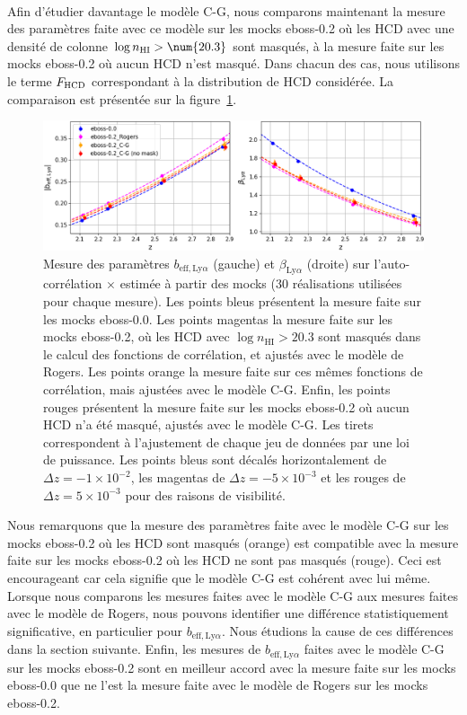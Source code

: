 \paragraph{}
Afin d'étudier davantage le modèle C-G, nous comparons maintenant la mesure des paramètres \lya{} faite avec ce modèle sur les mocks eboss-0.2 où les HCD avec une densité de colonne $\log n_{\textsc{HI}} > \num{20.3}$ sont masqués, à la mesure faite sur les mocks eboss-0.2 où aucun HCD n'est masqué. Dans chacun des cas, nous utilisons le terme $F_{\textsc{HCD}}$ correspondant à la distribution de HCD considérée.
La comparaison est présentée sur la figure~\ref{fig:bias_cg_rogers_comp}.
\begin{figure}
  \centering
  \includegraphics[scale=0.43]{bias_cg_rogers_comp}
  \caption{Mesure des paramètres $b_{\mathrm{eff},\mathrm{Ly}\alpha}$ (gauche) et $\beta_{\mathrm{Ly}\alpha}$ (droite) sur l'auto-corrélation \lya$\times$\lya{} estimée à partir des mocks (30 réalisations utilisées pour chaque mesure). Les points bleus présentent la mesure faite sur les mocks eboss-0.0. Les points magentas la mesure faite sur les mocks eboss-0.2, où les HCD avec $\log n_{\mathrm{HI}} > \num{20.3}$ sont masqués dans le calcul des fonctions de corrélation, et ajustés avec le modèle de Rogers. Les points orange la mesure faite sur ces mêmes fonctions de corrélation, mais ajustées avec le modèle C-G. Enfin, les points rouges présentent la mesure faite sur les mocks eboss-0.2 où aucun HCD n'a été masqué, ajustés avec le modèle C-G.
    Les tirets correspondent à l'ajustement de chaque jeu de données par une loi de puissance.
Les points bleus sont décalés horizontalement de $\Delta z = -1\times10^{-2}$, les magentas de $\Delta z = -5\times10^{-3}$ et les rouges de $\Delta z = 5\times10^{-3}$ pour des raisons de visibilité.}
  \label{fig:bias_cg_rogers_comp}
\end{figure}
Nous remarquons que la mesure des paramètres \lya{} faite avec le modèle C-G sur les mocks eboss-0.2 où les HCD sont masqués (orange) est compatible avec la mesure faite sur les mocks eboss-0.2 où les HCD ne sont pas masqués (rouge). Ceci est encourageant car cela signifie que le modèle C-G est cohérent avec lui même.
Lorsque nous comparons les mesures faites avec le modèle C-G aux mesures faites avec le modèle de Rogers, nous pouvons identifier une différence statistiquement significative, en particulier pour $b_{\mathrm{eff},\mathrm{Ly}\alpha}$. Nous étudions la cause de ces différences dans la section suivante.
Enfin, les mesures de $b_{\mathrm{eff},\mathrm{Ly}\alpha}$ faites avec le modèle C-G sur les mocks eboss-0.2 sont en meilleur accord avec la mesure faite sur les mocks eboss-0.0 que ne l'est la mesure faite avec le modèle de Rogers sur les mocks eboss-0.2.



